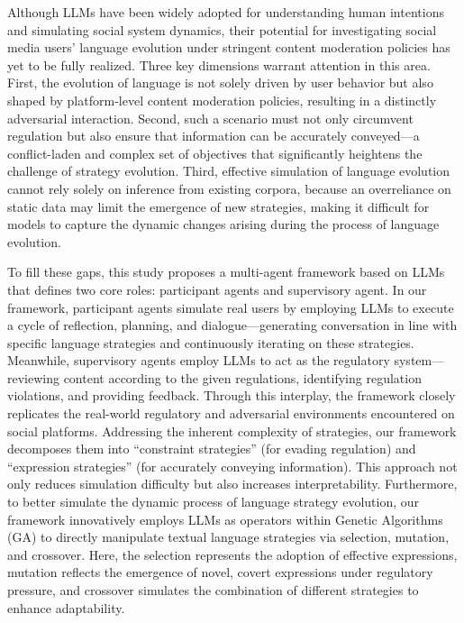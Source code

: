 Although LLMs have been widely adopted for understanding human intentions and simulating social system dynamics, their potential for investigating social media users' language evolution under stringent content moderation policies has yet to be fully realized. Three key dimensions warrant attention in this area. First, the evolution of language is not solely driven by user behavior but also shaped by platform-level content moderation policies, resulting in a distinctly adversarial interaction. Second, such a scenario must not only circumvent regulation but also ensure that information can be accurately conveyed—a conflict-laden and complex set of objectives that significantly heightens the challenge of strategy evolution. Third, effective simulation of language evolution cannot rely solely on inference from existing corpora, because an overreliance on static data may limit the emergence of new strategies, making it difficult for models to capture the dynamic changes arising during the process of language evolution.


To fill these gaps, this study proposes a multi-agent framework based on LLMs that defines two core roles: participant agents and supervisory agent. In our framework, participant agents simulate real users by employing LLMs to execute a cycle of reflection, planning, and dialogue—generating conversation in line with specific language strategies and continuously iterating on these strategies. Meanwhile, supervisory agents employ LLMs to act as the regulatory system—reviewing content according to the given regulations, identifying regulation violations, and providing feedback. Through this interplay, the framework closely replicates the real-world regulatory and adversarial environments encountered on social platforms.
Addressing the inherent complexity of strategies, our framework decomposes them into “constraint strategies” (for evading regulation) and “expression strategies” (for accurately conveying information). This approach not only reduces simulation difficulty but also increases interpretability. 
Furthermore, to better simulate the dynamic process of language strategy evolution, our framework innovatively employs LLMs as operators within Genetic Algorithms (GA) to directly manipulate textual language strategies via selection, mutation, and crossover. Here, the selection represents the adoption of effective expressions, mutation reflects the emergence of novel, covert expressions under regulatory pressure, and crossover simulates the combination of different strategies to enhance adaptability.

